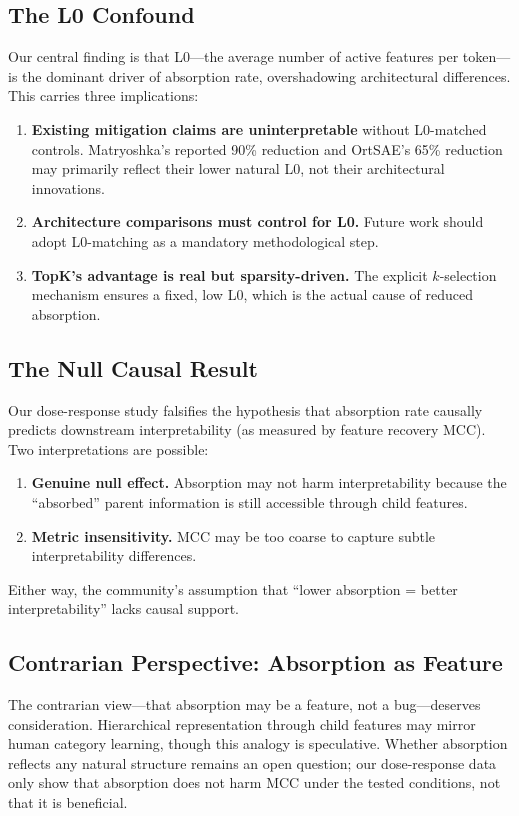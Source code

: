 \documentclass{article}
\begin{document}
\subsection{The L0 Confound}

Our central finding is that L0---the average number of active features per token---is the dominant driver of absorption rate, overshadowing architectural differences. This carries three implications:
\begin{enumerate}
    \item \textbf{Existing mitigation claims are uninterpretable} without L0-matched controls. Matryoshka's reported 90\% reduction and OrtSAE's 65\% reduction may primarily reflect their lower natural L0, not their architectural innovations.
    \item \textbf{Architecture comparisons must control for L0.} Future work should adopt L0-matching as a mandatory methodological step.
    \item \textbf{TopK's advantage is real but sparsity-driven.} The explicit $k$-selection mechanism ensures a fixed, low L0, which is the actual cause of reduced absorption.
\end{enumerate}

\subsection{The Null Causal Result}

Our dose-response study falsifies the hypothesis that absorption rate causally predicts downstream interpretability (as measured by feature recovery MCC). Two interpretations are possible:
\begin{enumerate}
    \item \textbf{Genuine null effect.} Absorption may not harm interpretability because the ``absorbed'' parent information is still accessible through child features.
    \item \textbf{Metric insensitivity.} MCC may be too coarse to capture subtle interpretability differences.
\end{enumerate}
Either way, the community's assumption that ``lower absorption = better interpretability'' lacks causal support.

\subsection{Contrarian Perspective: Absorption as Feature}

The contrarian view---that absorption may be a feature, not a bug---deserves consideration. Hierarchical representation through child features may mirror human category learning, though this analogy is speculative. Whether absorption reflects any natural structure remains an open question; our dose-response data only show that absorption does not harm MCC under the tested conditions, not that it is beneficial.
\end{document}
